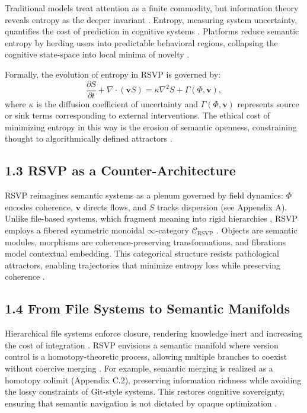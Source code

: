 \documentclass[12pt]{article}
\begin{document}
Traditional models treat attention as a finite commodity, but information theory reveals entropy as the deeper invariant \citep{cover2006}. Entropy, measuring system uncertainty, quantifies the cost of prediction in cognitive systems \citep{shannon1948}. Platforms reduce semantic entropy by herding users into predictable behavioral regions, collapsing the cognitive state-space into local minima of novelty \citep{jaynes2003}.

Formally, the evolution of entropy in RSVP is governed by:
\[
\frac{\partial S}{\partial t} + \nabla \cdot (\mathbf{v} S) = \kappa \nabla^2 S + \Gamma(\Phi, \mathbf{v}),
\]
where \(\kappa\) is the diffusion coefficient of uncertainty and \(\Gamma(\Phi, \mathbf{v})\) represents source or sink terms corresponding to external interventions. The ethical cost of minimizing entropy in this way is the erosion of semantic openness, constraining thought to algorithmically defined attractors \citep{deleuze1987}.

\subsection*{1.3 RSVP as a Counter-Architecture}

RSVP reimagines semantic systems as a plenum governed by field dynamics: \(\Phi\) encodes coherence, \(\mathbf{v}\) directs flows, and \(S\) tracks dispersion (see Appendix A). Unlike file-based systems, which fragment meaning into rigid hierarchies \citep{bird1988}, RSVP employs a fibered symmetric monoidal \(\infty\)-category \(\mathcal{C}_{\text{RSVP}}\) \citep{maclane1998}. Objects are semantic modules, morphisms are coherence-preserving transformations, and fibrations model contextual embedding. This categorical structure resists pathological attractors, enabling trajectories that minimize entropy loss while preserving coherence \citep{baez2011}.

\subsection*{1.4 From File Systems to Semantic Manifolds}

Hierarchical file systems enforce closure, rendering knowledge inert and increasing the cost of integration \citep{whitehead1978}. RSVP envisions a semantic manifold where version control is a homotopy-theoretic process, allowing multiple branches to coexist without coercive merging \citep{hatcher2002}. For example, semantic merging is realized as a homotopy colimit (Appendix C.2), preserving information richness while avoiding the lossy constraints of Git-style systems. This restores cognitive sovereignty, ensuring that semantic navigation is not dictated by opaque optimization \citep{ortega1957}.
\end{document}
